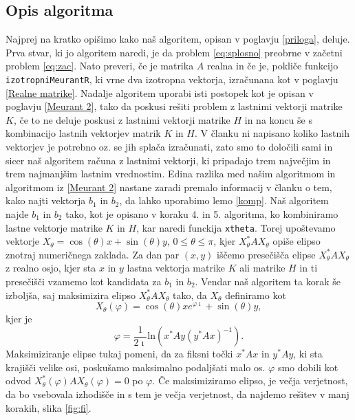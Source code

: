 \documentclass[12pt,a4paper]{amsart}
\theoremstyle{definition}
\theoremstyle{plain}
\begin{document}
\subsection{Opis algoritma}
Najprej na kratko opišimo kako naš algoritem, opisan v poglavju \ref{priloga}, deluje. \\
Prva stvar, ki jo algoritem naredi, je da problem \eqref{eq:splosno} preobrne v začetni problem \eqref{eq:zac}. 
Nato preveri, če je matrika $A$ realna in če je, pokliče funkcijo \verb+izotropniMeurantR+, ki vrne dva izotropna vektorja, izračunana kot v poglavju \ref{Realne matrike}. 
Nadalje algoritem uporabi isti postopek kot je opisan v poglavju \ref{Meurant 2}, tako da poskusi rešiti problem z lastnimi vektorji matrike $K$, če to ne deluje poskusi z lastnimi vektorji matrike $H$ in na koncu še s kombinacijo lastnih vektorjev matrik $K$ in $H$. 
V članku \cite{meurant} ni napisano koliko lastnih vektorjev je potrebno oz. se jih splača izračunati, zato smo to določili sami in sicer naš algoritem računa z lastnimi vektorji, ki pripadajo trem največjim in trem najmanjšim lastnim vrednostim. 
Edina razlika med našim algoritmom in algoritmom iz \ref{Meurant 2} nastane zaradi premalo informacij v članku \cite{meurant} o tem, kako najti vektorja $b_1$ in $b_2$, da lahko uporabimo lemo \ref{komp}. 
Naš algoritem najde $b_1$ in $b_2$ tako, kot je opisano v koraku 4. in 5. algoritma, ko kombiniramo lastne vektorje matrike $K$ in $H$, kar naredi funckija \verb+xtheta+. 
Torej upoštevamo vektorje $X_\theta =\cos(\theta)x+\sin(\theta)y$, $0\le\theta\le\pi$, kjer $X_\theta ^\ast AX_\theta$ opiše elipso znotraj numeričnega zaklada. 
Za dan par $(x,y)$ iščemo presečišča elipse $X_\theta ^\ast AX_\theta$ z realno osjo, kjer sta $x$ in $y$ lastna vektorja matrike $K$ ali matrike $H$ in ti presečišči vzamemo kot kandidata za $b_1$ in $b_2$. 
Vendar naš algoritem ta korak še izboljša, saj maksimizira elipso $X_\theta ^\ast AX_\theta$ tako, da $X_\theta$ definiramo kot 
$$X_\theta (\varphi) =\cos(\theta)x e^{\varphi \imath}+\sin(\theta)y,$$ kjer je $$\varphi = \frac{1}{2\imath} \text{ln}(x^\ast Ay (y^\ast Ax)^{-1}).$$ 
Maksimiziranje elipse tukaj pomeni, da za fiksni točki $x^\ast Ax$ in $y^\ast Ay$, ki sta krajišči velike osi, poskušamo maksimalno podaljšati malo os.
$\varphi$ smo dobili kot odvod $X_\theta ^\ast (\varphi) A X_\theta (\varphi) = 0$ po $\varphi$.
Če maksimiziramo elipso, je večja verjetnost, da bo vsebovala izhodišče in s tem je večja verjetnost, da najdemo rešitev v manj korakih, slika \ref{fig:fi}.
\end{document}
